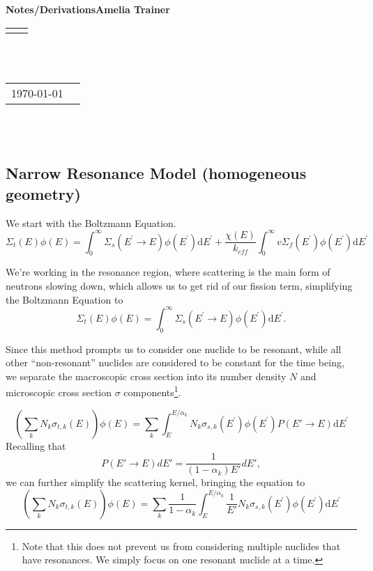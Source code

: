 \documentclass[10pt]{article}
\renewcommand{\title}[1]{\textbf{#1}\\}
\renewcommand{\line}{\begin{tabularx}{\textwidth}{X>{\raggedleft}X}\hline\\\end{tabularx}\\[-0.5cm]}
\newcommand{\leftright}[2]{\begin{tabularx}{\textwidth}{X>{\raggedleft}X}#1%
\end{tabularx}\\[-0.5cm]}
\begin{document}
\title{Notes/Derivations\qquad Amelia Trainer }
\line\\
\leftright{\today}{ }%
~\par

\subsection*{Narrow Resonance Model (homogeneous geometry)}
We start with the Boltzmann Equation.
\begin{equation}\Sigma_{t}(E)\phi(E)=\int_{0}^{\infty}\Sigma_{s}\left(E^{\prime}\rightarrow E\right)\phi\left(E^{\prime}\right)\mathrm{d}E^{\prime}+\frac{\chi(E)}{k_{eff}}\int_{0}^{\infty}v\Sigma_{f}\left(E^{\prime}\right)\phi\left(E^{\prime}\right)\mathrm{d}E^{\prime}\end{equation}

We're working in the resonance region, where scattering is the main form of neutrons slowing down, which allows us to get rid of our fission term, simplifying the Boltzmann Equation to
\begin{equation}\Sigma_{t}(E)\phi(E)=\int_{0}^{\infty}\Sigma_{s}\left(E^{\prime}\rightarrow E\right)\phi\left(E^{\prime}\right)\mathrm{d}E^{\prime}.\end{equation}

Since this method prompts us to consider one nuclide to be resonant, while all other ``non-resonant'' nuclides are considered to be constant for the time being, we separate the macroscopic cross section into its number density $N$ and microscopic cross section $\sigma$ components\footnote{Note that this does not prevent us from considering multiple nuclides that have resonances. We simply focus on one resonant nuclide at a time.}.

\begin{equation}\left(\sum\limits_{k}N_{k}\sigma_{t,k}(E)\right)\phi(E)=\sum\limits_{k}\int_{E}^{E/\alpha_{k}}N_{k}\sigma_{s,k}\left(E^{\prime}\right)\phi\left(E^{\prime}\right)P(E'\rightarrow E)\mathrm{d}E^{\prime}\end{equation}
Recalling that 
\begin{equation}P(E'\rightarrow E)dE'=\frac{1}{(1-\alpha_k)E'}dE',\end{equation}
we can further simplify the scattering kernel, bringing the equation to
\begin{equation}\left(\sum\limits_{k}N_{k}\sigma_{t,k}(E)\right)\phi(E)=\sum\limits_{k}\frac{1}{1-\alpha_{k}}\int_{E}^{E/\alpha_{k}}\frac{1}{E'}N_{k}\sigma_{s,k}\left(E^{\prime}\right)\phi\left(E^{\prime}\right)\mathrm{d}E^{\prime}\end{equation}
\end{document}
